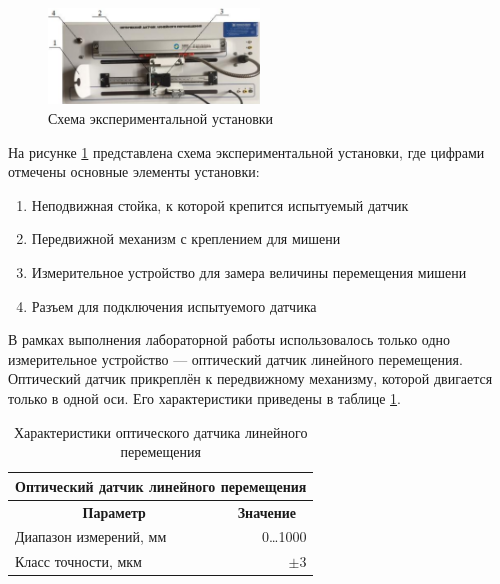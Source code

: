 \documentclass[a4paper]{article}
\begin{document}
\begin{figure}[H]
    \centering
    \includegraphics[width=0.5\textwidth]{scheme.png}
    \caption{Схема экспериментальной установки}
    \label{fig:exp}
\end{figure}
На рисунке \ref{fig:exp} представлена схема экспериментальной установки, где цифрами отмечены основные элементы установки:
\begin{enumerate}
    \item Неподвижная стойка, к которой крепится испытуемый датчик
    \item Передвижной механизм с креплением для мишени
    \item Измерительное устройство для замера величины перемещения мишени
    \item Разъем для подключения испытуемого датчика
\end{enumerate}
\newpage
{}
В рамках выполнения лабораторной работы использовалось только одно измерительное устройство — оптический датчик линейного перемещения. Оптический датчик прикреплён к передвижному механизму, которой двигается только в одной оси. Его характеристики приведены в таблице \ref{tab:odlp}.
\begin{table}[H]
    \centering
    \begin{tabular}{|l|r|}
        \hline
        \multicolumn{2}{|c|}{\textbf{Оптический датчик линейного перемещения}} \\ \hline\hline
        \multicolumn{1}{|c|}{\textbf{Параметр}} & \multicolumn{1}{|c|}{\textbf{Значение}} \\ \hline
        Диапазон измерений, мм & 0\dots 1000 \\ \hline
        Класс точности, мкм & $\pm$3 \\ \hline
    \end{tabular}
    \caption{Характеристики оптического датчика линейного перемещения}
    \label{tab:odlp}
\end{table}
\end{document}

